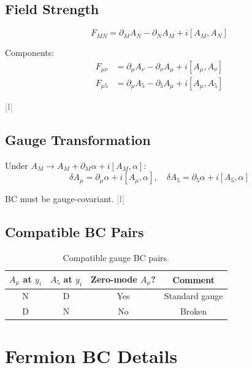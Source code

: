 \documentclass[11pt,a4paper]{article}
\newcommand{\tagI}{\textcolor{gray}{[I]}}
\begin{document}
\subsection{Field Strength}

\begin{equation}
\label{eq:app-field-str}
F_{MN} = \partial_M A_N - \partial_N A_M + i[A_M, A_N]
\end{equation}

Components:
\begin{align}
\label{eq:app-Fmunu}
F_{\mu\nu} &= \partial_\mu A_\nu - \partial_\nu A_\mu + i[A_\mu, A_\nu] \\
\label{eq:app-Fmu5}
F_{\mu 5} &= \partial_\mu A_5 - \partial_5 A_\mu + i[A_\mu, A_5]
\end{align}

\tagI

\subsection{Gauge Transformation}

Under $A_M \to A_M + \partial_M \alpha + i[A_M, \alpha]$:
\begin{equation}
\label{eq:app-gauge-trans}
\delta A_\mu = \partial_\mu \alpha + i[A_\mu, \alpha], \quad \delta A_5 = \partial_5 \alpha + i[A_5, \alpha]
\end{equation}

BC must be gauge-covariant. \tagI

\subsection{Compatible BC Pairs}

\begin{table}[h]
\centering
\begin{tabular}{cccc}
\toprule
$A_\mu$ at $y_i$ & $A_5$ at $y_i$ & Zero-mode $A_\mu$? & Comment \\
\midrule
N & D & Yes & Standard gauge \\
D & N & No & Broken \\
\bottomrule
\end{tabular}
\caption{Compatible gauge BC pairs.}
\label{tab:app-gauge-bc}
\end{table}

\section{Fermion BC Details}
\label{app:fermion}
\end{document}
